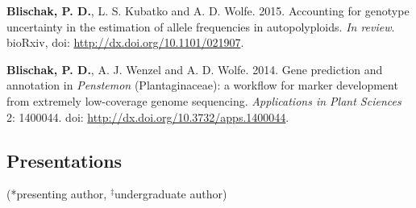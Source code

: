 \documentclass[]{article}
\begin{document}
\begin{etaremune}
\def\labelenumi{\arabic{enumi}.}
\item
  \textbf{Blischak, P. D.}, L. S. Kubatko and A. D. Wolfe. 2015.
  Accounting for genotype uncertainty in the estimation of allele
  frequencies in autopolyploids. \emph{In review}. bioRxiv, doi:
  \href{http://dx.doi.org/10.1101/021907}{\url{http://dx.doi.org/10.1101/021907}}.
\item
  \textbf{Blischak, P. D.}, A. J. Wenzel and A. D. Wolfe. 2014. Gene
  prediction and annotation in \textit{Penstemon} (Plantaginaceae): a
  workflow for marker development from extremely low-coverage genome
  sequencing. \emph{Applications in Plant Sciences} 2: 1400044. doi:
  \href{http://dx.doi.org/10.3732/apps.1400044}{\url{http://dx.doi.org/10.3732/apps.1400044}}.
\end{etaremune}

\subsection{\texorpdfstring{\textbf{Presentations}}{Presentations}}\label{presentations}

(*presenting author, \(^{\ddagger}\)undergraduate author)
\end{document}
